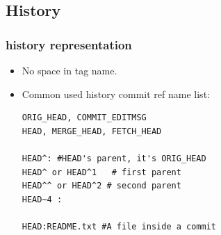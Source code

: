 \documentclass[a4paper,11pt,twoside]{book}
\begin{document}
\subsection{History}
\subsubsection{history representation}
\begin{itemize}
\item No space in tag name.
\item Common used history commit ref name list: 
\begin{verbatim}
ORIG_HEAD, COMMIT_EDITMSG
HEAD, MERGE_HEAD, FETCH_HEAD

HEAD^: #HEAD's parent, it's ORIG_HEAD
HEAD^ or HEAD^1   # first parent
HEAD^^ or HEAD^2 # second parent
HEAD~4 : 

HEAD:README.txt #A file inside a commit
\end{verbatim}
\end{itemize}
\end{document}
